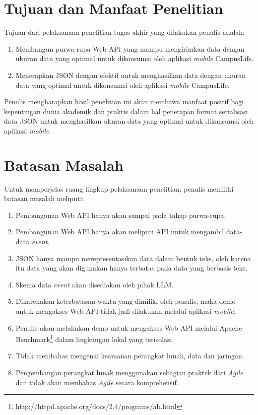 \documentclass[a4paper, 12pt, oneside]{report}
\begin{document}
\section{Tujuan dan Manfaat Penelitian}
\onehalfspacing Tujuan dari pelaksanaan penelitian tugas akhir yang dilakukan penulis adalah:
\begin{enumerate}
  \item Membangun purwa-rupa Web API yang mampu mengirimkan data dengan ukuran data yang optimal untuk dikonsumsi oleh aplikasi \textit{mobile} CampusLife.
  \item Menerapkan JSON dengan efektif untuk menghasilkan data dengan ukuran data yang optimal untuk dikonsumsi oleh aplikasi \textit{mobile} CampusLife.
\end{enumerate}

\onehalfspacing Penulis mengharapkan hasil penelitian ini akan membawa manfaat positif bagi kepentingan dunia akademik dan praktis dalam hal penerapan format serialisasi data JSON untuk menghasilkan ukuran data yang optimal untuk dikonsumsi oleh aplikasi \textit{mobile}.

\section{Batasan Masalah}
\onehalfspacing Untuk memperjelas ruang lingkup pelaksanaan penelitian, penulis memiliki batasan masalah meliputi:
\onehalfspacing
\begin{enumerate}
  \item Pembangunan Web API hanya akan sampai pada tahap purwa-rupa.
  \item Pembangunan Web API hanya akan meliputi API untuk mengambil data-data \textit{event}.
  \item JSON hanya mampu merepresentasikan data dalam bentuk teks, oleh karena itu data yang akan digunakan hanya terbatas pada data yang berbasis teks.
  \item Skema data \textit{event} akan disediakan oleh pihak LLM.
  \item Dikarenakan keterbatasan waktu yang dimiliki oleh penulis, maka demo untuk mengakses Web API tidak jadi dilakukan melalui aplikasi \textit{mobile}.
  \item Penulis akan melakukan demo untuk mengakses Web API melalui Apache Benchmark\footnote{http://httpd.apache.org/docs/2.4/programs/ab.html} dalam lingkungan lokal yang terisolasi.
  \item Tidak membahas mengenai keamanan perangkat lunak, data dan jaringan.
  \item Pengembangan perangkat lunak menggunakan sebagian praktek dari \textit{Agile} dan tidak akan membahas \textit{Agile} secara komprehensif.
\end{enumerate}
\end{document}

